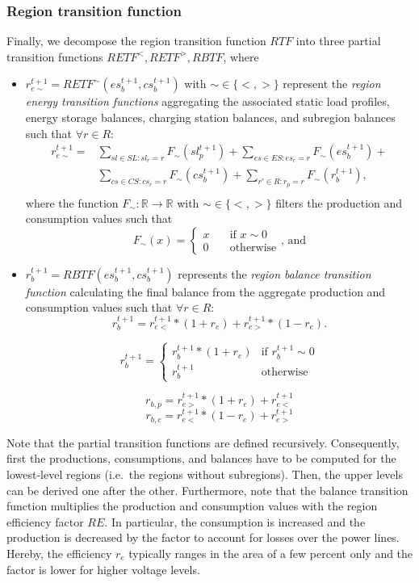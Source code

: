 \subsubsection{Region transition function}
\label{transitions_regions}

Finally, we decompose the region transition function $RTF$ into three partial transition functions $RETF^<,RETF^>,RBTF$, where
\begin{itemize}
	\item $r_{e\sim}^{t+1} = RETF^\sim(es_b^{t+1}, cs_b^{t+1})$ with $\sim \in \{<,>\}$ represent the \textit{region energy transition functions} aggregating the associated static load profiles, energy storage balances, charging station balances, and subregion balances such that $\forall r \in R:$
		\begin{equation*}
		\begin{split}
		r_{e\sim}^{t+1} = & \sum_{sl \in SL: sl_r = r} F_\sim(sl_p^{t+1}) + 
		 \sum_{es \in ES: es_r = r} F_\sim(es_b^{t+1}) + \\
		& \sum_{cs \in CS: cs_r = r} F_\sim(cs_b^{t+1}) + 
		 \sum_{r' \in R: r_p = r} F_\sim(r_b^{t+1})\textrm{,} \\
		\end{split}
		\end{equation*}
	where the function $F_\sim: \mathbb{R} \rightarrow \mathbb{R}$ with $\sim \in \{<,>\}$ filters the production and consumption values such that
	\[
		F_\sim(x) = \begin{cases}
			x & \quad \textrm{if } x \sim 0 \\
			0 & \quad \textrm{otherwise}
		\end{cases}
		\textrm{, and}
	\]
	\item $r_b^{t+1} = RBTF(es_b^{t+1}, cs_b^{t+1})$ represents the \textit{region balance transition function} calculating the final balance from the aggregate production and consumption values such that $\forall r \in R:$
	\[
		r_b^{t+1} = r_{e<}^{t+1} * (1 + r_e) +
		r_{e>}^{t+1} * (1 - r_e) \textrm{.}
	\]
	
	\[
		r_b^{t+1} = \begin{cases}
		r_b^{t+1} * (1 + r_e) & \textrm{if } r_b^{t+1} \sim 0 \\
		r_b^{t+1} & \textrm{otherwise}
		\end{cases}
	\]
	
	\[
		r_{b,p} =	r_{e>}^{t+1} * (1 + r_e) + r_{e<}^{t+1} 
	\]	
	\[
		r_{b,c} =	r_{e<}^{t+1} * (1 - r_e) + r_{e>}^{t+1} 
	\]	
\end{itemize}
Note that the partial transition functions are defined recursively. Consequently, first the productions, consumptions, and balances have to be computed for the lowest-level regions (i.e.\ the regions without subregions). Then, the upper levels can be derived one after the other. Furthermore, note that the balance transition function multiplies the production and consumption values with the region efficiency factor $RE$. In particular, the consumption is increased and the production is decreased by the factor to account for losses over the power lines. Hereby, the efficiency $r_e$ typically ranges in the area of a few percent only and the factor is lower for higher voltage levels.
